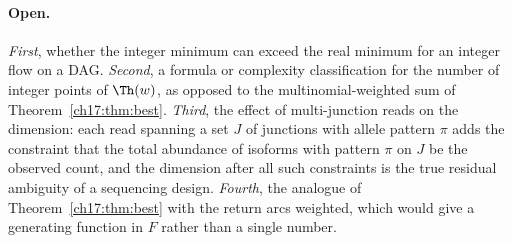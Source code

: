 \paragraph{Open.} \emph{First}, whether the integer minimum can exceed the real minimum
for an integer flow on a DAG. \emph{Second}, a formula or complexity classification for the
number of integer points of $\Th(w)$, as opposed to the multinomial-weighted sum of
Theorem~\ref{ch17:thm:best}. \emph{Third}, the effect of multi-junction reads on the dimension:
each read spanning a set $J$ of junctions with allele pattern $\pi$ adds the constraint that
the total abundance of isoforms with pattern $\pi$ on $J$ be the observed count, and the
dimension after all such constraints is the true residual ambiguity of a sequencing design.
\emph{Fourth}, the analogue of Theorem~\ref{ch17:thm:best} with the return arcs weighted, which
would give a generating function in $F$ rather than a single number.
